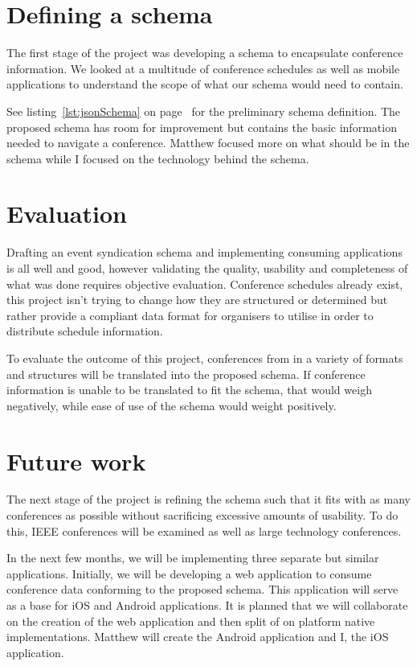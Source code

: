 \documentclass{article}
\begin{document}
\section{Defining a schema}
The first stage of the project was developing a schema to encapsulate conference information. We looked at a multitude of conference schedules as well as mobile applications to understand the scope of what our schema would need to contain.

See listing~\ref{lst:jsonSchema} on page~\pageref{lst:jsonSchema} for the preliminary schema definition. The proposed schema has room for improvement but contains the basic information needed to navigate a conference. Matthew focused more on what should be in the schema while I focused on the technology behind the schema.

\section{Evaluation}
Drafting an event syndication schema and implementing consuming applications is all well and good, however validating the quality, usability and completeness of what was done requires objective evaluation. Conference schedules already exist, this project isn't trying to change how they are structured or determined but rather provide a compliant data format for organisers to utilise in order to distribute schedule information.

To evaluate the outcome of this project, conferences from in a variety of formats and structures will be translated into the proposed schema. If conference information is unable to be translated to fit the schema, that would weigh negatively, while ease of use of the schema would weight positively.

\section{Future work}
The next stage of the project is refining the schema such that it fits with as many conferences as possible without sacrificing excessive amounts of usability. To do this, IEEE conferences will be examined as well as large technology conferences.

In the next few months, we will be implementing three separate but similar applications. Initially, we will be developing a web application to consume conference data conforming to the proposed schema. This application will serve as a base for iOS and Android applications. It is planned that we will collaborate on the creation of the web application and then split of on platform native implementations. Matthew will create the Android application and I, the iOS application.
\end{document}
